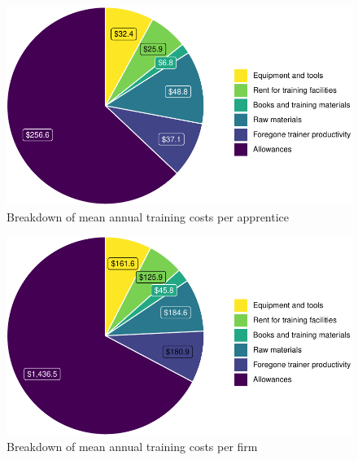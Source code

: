 \documentclass[
  11pt,
a4paper
]{article}
\begin{document}
\renewcommand{\arraystretch}{1}

\begin{figure}[H]
\includegraphics{figures/fig-costspie-1} \caption{Breakdown of mean annual training costs per apprentice}\label{fig:fig-costspie}
\end{figure}

\begin{figure}[H]
\includegraphics{figures/fig-costspie2-1} \caption{Breakdown of mean annual training costs per firm}\label{fig:fig-costspie2}
\end{figure}
\end{document}
